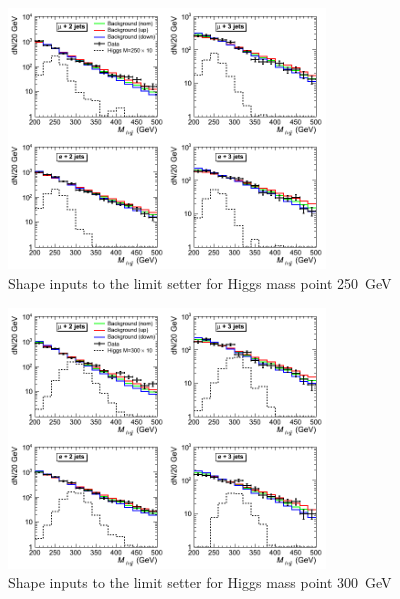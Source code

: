 \begin{figure}[h!]
\begin{center}
\includegraphics[width=0.75\textwidth]{plots/2012_SHAPES/hww-histo-shapes-M=250}
\caption{Shape inputs to the limit setter for Higgs mass point 250~GeV}
\end{center}
\end{figure}
\begin{figure}[h!]
\begin{center}
\includegraphics[width=0.75\textwidth]{plots/2012_SHAPES/hww-histo-shapes-M=300}
\caption{Shape inputs to the limit setter for Higgs mass point 300~GeV}
\end{center}
\end{figure}

\clearpage

